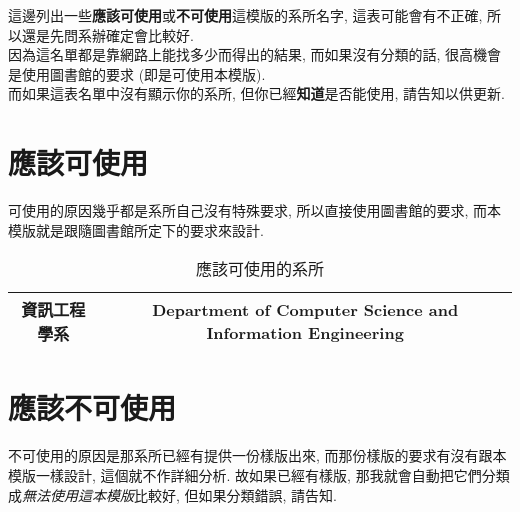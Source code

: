
這邊列出一些\textbf{應該可使用}或\textbf{不可使用}這模版的系所名字, 這表可能會有不正確, 所以還是先問系辦確定會比較好. \\

因為這名單都是靠網路上能找多少而得出的結果, 而如果沒有分類的話, 很高機會是使用圖書館的要求 (即是可使用本模版). \\

而如果這表名單中沒有顯示你的系所, 但你已經\textbf{知道}是否能使用, 請告知以供更新.

\clearpage

\section{應該可使用}

  可使用的原因幾乎都是系所自己沒有特殊要求, 所以直接使用圖書館的要求, 而本模版就是跟隨圖書館所定下的要求來設計.

  \begin{table*}[pht]
    \centering
    \caption{應該可使用的系所}
    \label{table:acceptable-dept:acceptable}
    \begin{tabular}{|c|c|}

    \hline
    \multicolumn{1}{|c|}{資訊工程學系} &
    \multicolumn{1}{c|}{Department of Computer Science and Information Engineering} \\

    \hline
    \end{tabular}
  \end{table*}

\section{應該不可使用}

  不可使用的原因是那系所已經有提供一份樣版出來, 而那份樣版的要求有沒有跟本模版一樣設計, 這個就不作詳細分析. 故如果已經有樣版, 那我就會自動把它們分類成\textit{無法使用這本模版}比較好, 但如果分類錯誤, 請告知.


